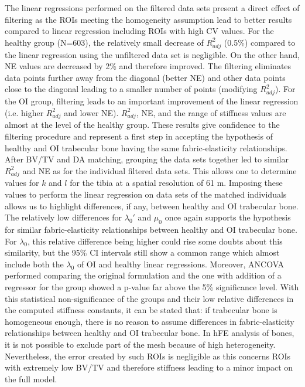 \documentclass[a4paper,fleqn]{DC_ArtStyle}
\begin{document}
	The linear regressions performed on the filtered data sets present a direct effect of filtering as the ROIs meeting the homogeneity assumption lead to better results compared to linear regression including ROIs with high CV values. For the healthy group (N=603), the relatively small decrease of $R^2_{adj}$ (0.5\%) compared to the linear regression using the unfiltered data set is negligible. On the other hand, NE values are decreased by 2\% and therefore improved. The filtering eliminates data points further away from the diagonal (better NE) and other data points close to the diagonal leading to a smaller number of points (modifying $R^2_{adj}$). For the OI group, filtering leads to an important improvement of the linear regression (i.e. higher $R^2_{adj}$ and lower NE). $R^2_{adj}$, NE, and the range of stiffness values are almost at the level of the healthy group. These results give confidence to the filtering procedure and represent a first step in accepting the hypothesis of healthy and OI trabecular bone having the same fabric-elasticity relationships.\\
	
	After BV/TV and DA matching, grouping the data sets together led to similar $R^2_{adj}$ and NE as for the individual filtered data sets. This allows one to determine values for $k$ and $l$ for the tibia at a spatial resolution of 61 \si{\micro}m. Imposing these values to perform the linear regression on data sets of the matched individuals allows us to highlight differences, if any, between healthy and OI trabecular bone. The relatively low differences for $\lambda_0'$ and $\mu_0$ once again supports the hypothesis for similar fabric-elasticity relationships between healthy and OI trabecular bone. For $\lambda_0$, this relative difference being higher could rise some doubts about this similarity, but the 95\% CI intervals still show a common range which almost include both the $\lambda_0$ of OI and healthy linear regressions. Moreover, ANCOVA performed comparing the original formulation and the one with addition of a regressor for the group showed a p-value far above the 5\% significance level. With this statistical non-significance of the groups and their low relative differences in the computed stiffness constants, it can be stated that: if trabecular bone is homogeneous enough, there is no reason to assume differences in fabric-elasticity relationships between healthy and OI trabecular bone. In hFE analysis of bones, it is not possible to exclude part of the mesh because of high heterogeneity. Nevertheless, the error created by such ROIs is negligible as this concerns ROIs with extremely low BV/TV and therefore stiffness leading to a minor impact on the full model.\\
	
\end{document}
